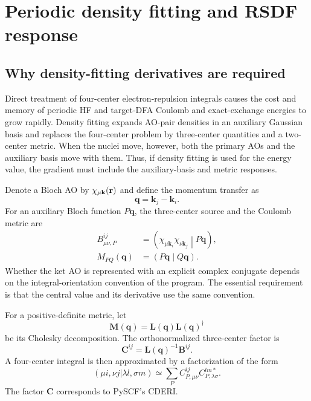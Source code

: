 \section{Periodic density fitting and RSDF response}
\label{sec:periodic-df}

\subsection{Why density-fitting derivatives are required}

Direct treatment of four-center electron-repulsion integrals causes the cost
and memory of periodic HF and target-DFA Coulomb and exact-exchange energies to
grow rapidly.  Density fitting expands AO-pair densities in an auxiliary
Gaussian basis and replaces the four-center problem by three-center quantities
and a two-center metric.  When the nuclei move, however, both the primary AOs
and the auxiliary basis move with them.  Thus, if density fitting is used for
the energy value, the gradient must include the auxiliary-basis and metric
responses.

Denote a Bloch AO by $\chi_{\mu\mathbf{k}}(\mathbf r)$ and define the momentum transfer
as
\begin{equation}
  \mathbf q=\mathbf k_j-\mathbf k_i.
\end{equation}
For an auxiliary Bloch function $P\mathbf q$, the three-center source and the
Coulomb metric are
\begin{align}
  B_{\mu\nu,P}^{ij}
  &=\left(\chi_{\mu\mathbf k_i}\chi_{\nu\mathbf k_j}\middle|P\mathbf q\right),\\
  M_{PQ}(\mathbf q)
  &=\left(P\mathbf q\middle|Q\mathbf q\right).
\end{align}
Whether the ket AO is represented with an explicit complex conjugate depends
on the integral-orientation convention of the program.  The essential
requirement is that the central value and its derivative use the same
convention.

For a positive-definite metric, let
\begin{equation}
  \mathbf M(\mathbf q)=\mathbf L(\mathbf q)\mathbf L(\mathbf q)^\dagger
\end{equation}
be its Cholesky decomposition.  The orthonormalized three-center factor is
\begin{equation}
  \mathbf C^{ij}=\mathbf L(\mathbf q)^{-1}\mathbf B^{ij}.
  \label{eq:cderi-definition}
\end{equation}
A four-center integral is then approximated by a factorization of the form
\begin{equation}
  (\mu i,\nu j|\lambda l,\sigma m)
  \simeq \sum_P C_{P,\mu\nu}^{ij}
  C_{P,\lambda\sigma}^{lm*}.
\end{equation}
The factor $\mathbf C$ corresponds to PySCF's CDERI.

